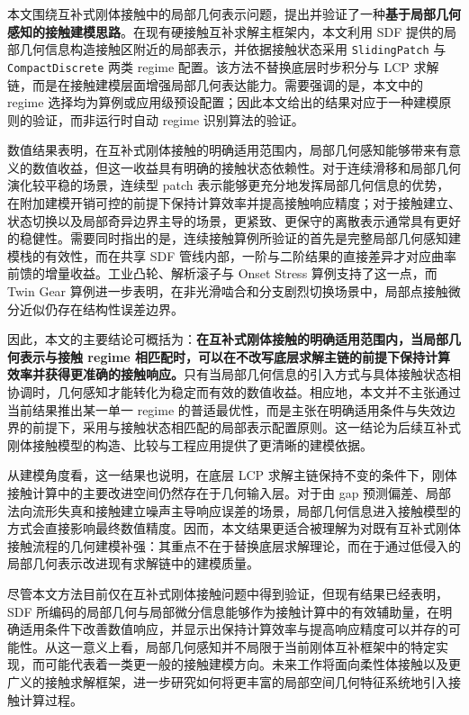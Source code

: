 本文围绕互补式刚体接触中的局部几何表示问题，提出并验证了一种\textbf{基于局部几何感知的接触建模思路}。在现有硬接触互补求解主框架内，本文利用 SDF 提供的局部几何信息构造接触区附近的局部表示，并依据接触状态采用 \texttt{SlidingPatch} 与 \texttt{CompactDiscrete} 两类 regime 配置。该方法不替换底层时步积分与 LCP 求解链，而是在接触建模层面增强局部几何表达能力。需要强调的是，本文中的 regime 选择均为算例或应用级预设配置；因此本文给出的结果对应于一种建模原则的验证，而非运行时自动 regime 识别算法的验证。

数值结果表明，在互补式刚体接触的明确适用范围内，局部几何感知能够带来有意义的数值收益，但这一收益具有明确的接触状态依赖性。对于连续滑移和局部几何演化较平稳的场景，连续型 patch 表示能够更充分地发挥局部几何信息的优势，在附加建模开销可控的前提下保持计算效率并提高接触响应精度；对于接触建立、状态切换以及局部奇异边界主导的场景，更紧致、更保守的离散表示通常具有更好的稳健性。需要同时指出的是，连续接触算例所验证的首先是完整局部几何感知建模栈的有效性，而在共享 SDF 管线内部，一阶与二阶结果的直接差异才对应曲率前馈的增量收益。工业凸轮、解析滚子与 Onset Stress 算例支持了这一点，而 Twin Gear 算例进一步表明，在非光滑啮合和分支剧烈切换场景中，局部点接触微分近似仍存在结构性误差边界。

因此，本文的主要结论可概括为：\textbf{在互补式刚体接触的明确适用范围内，当局部几何表示与接触 regime 相匹配时，可以在不改写底层求解主链的前提下保持计算效率并获得更准确的接触响应。}只有当局部几何信息的引入方式与具体接触状态相协调时，几何感知才能转化为稳定而有效的数值收益。相应地，本文并不主张通过当前结果推出某一单一 regime 的普适最优性，而是主张在明确适用条件与失效边界的前提下，采用与接触状态相匹配的局部表示配置原则。这一结论为后续互补式刚体接触模型的构造、比较与工程应用提供了更清晰的建模依据。

从建模角度看，这一结果也说明，在底层 LCP 求解主链保持不变的条件下，刚体接触计算中的主要改进空间仍然存在于几何输入层。对于由 gap 预测偏差、局部法向流形失真和接触建立噪声主导响应误差的场景，局部几何信息进入接触模型的方式会直接影响最终数值精度。因而，本文结果更适合被理解为对既有互补式刚体接触流程的几何建模补强：其重点不在于替换底层求解理论，而在于通过低侵入的局部几何表示改进现有求解链中的建模质量。

尽管本文方法目前仅在互补式刚体接触问题中得到验证，但现有结果已经表明，SDF 所编码的局部几何与局部微分信息能够作为接触计算中的有效辅助量，在明确适用条件下改善数值响应，并显示出保持计算效率与提高响应精度可以并存的可能性。从这一意义上看，局部几何感知并不局限于当前刚体互补框架中的特定实现，而可能代表着一类更一般的接触建模方向。未来工作将面向柔性体接触以及更广义的接触求解框架，进一步研究如何将更丰富的局部空间几何特征系统地引入接触计算过程。
